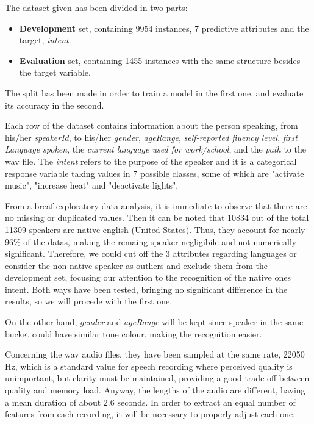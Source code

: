 \documentclass[conference]{IEEEtran}
\begin{document}
The dataset given has been divided in two parts:
\begin{itemize}
    \item \textbf{Development} set, containing 9954 instances, 7 predictive attributes and the target, \textit{intent}.
    \item \textbf{Evaluation} set, containing 1455 instances with the same structure besides the target variable.
\end{itemize}
The split has been made in order to train a model in the first one, and evaluate its accuracy in the second.

Each row of the dataset contains information about the person speaking, from his/her \textit{speakerId}, to his/her \textit{gender}, \textit{ageRange}, \textit{self-reported fluency level}, \textit{first Language spoken}, the \textit{current language used for work/school}, and the \textit{path} to the wav file.
The \textit{intent} refers to the purpose of the speaker and it is a categorical response variable taking values in 7 possible classes, some of which are "activate music", "increase heat" and "deactivate lights".

From a breaf exploratory data analysis, it is immediate to observe that there are no missing or duplicated values. 
Then it can be noted that 10834 out of the total 11309 speakers are native english (United States).
Thus, they account for nearly 96\% of the datas, making the remaing speaker negligibile and not numerically significant.
Therefore, we could cut off the 3 attributes regarding languages or consider the non native speaker as outliers and exclude them from the development set, focusing our attention to the recognition of the native ones intent.
Both ways have been tested, bringing no significant difference in the results, so we will procede with the first one.

On the other hand, \textit{gender} and \textit{ageRange} will be kept since speaker in the same bucket could have similar tone colour, making the recognition easier.

Concerning the wav audio files, they have been sampled at the same rate, 22050 Hz, which is a standard value for speech recording where perceived quality is unimportant, but clarity must be maintained, providing a good trade-off between quality and memory load.
Anyway, the lengths of the audio are different, having a mean duration of about 2.6 seconds.
In order to extract an equal number of features from each recording, it will be necessary to properly adjust each one. 
\end{document}
